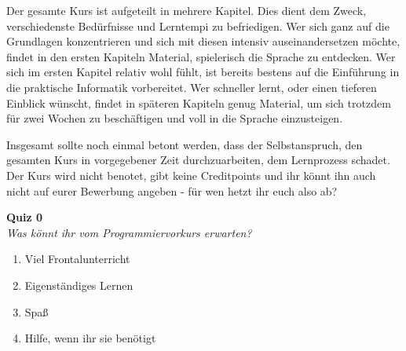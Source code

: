 \documentclass{vorkurs}
\begin{document}
Der gesamte Kurs ist aufgeteilt in mehrere Kapitel. Dies dient dem Zweck,
verschiedenste Bedürfnisse und Lerntempi zu befriedigen.  Wer sich ganz auf die
Grundlagen konzentrieren und sich mit diesen intensiv auseinandersetzen möchte,
findet in den ersten Kapiteln Material, spielerisch die Sprache zu entdecken.
Wer sich im ersten Kapitel relativ wohl fühlt, ist bereits bestens auf die
Einführung in die praktische Informatik vorbereitet.  Wer schneller lernt, oder
einen tieferen Einblick wünscht, findet in späteren Kapiteln genug Material, um
sich trotzdem für zwei Wochen zu beschäftigen und voll in die Sprache
einzusteigen.

Insgesamt sollte noch einmal betont werden, dass der Selbstanspruch, den
gesamten Kurs in vorgegebener Zeit durchzuarbeiten, dem Lernprozess schadet.
Der Kurs wird nicht benotet, gibt keine Creditpoints und ihr könnt ihn auch
nicht auf eurer Bewerbung angeben - für wen hetzt ihr euch also ab?

\textbf{Quiz 0}\\
\textit{Was könnt ihr vom Programmiervorkurs erwarten?}
\begin{enumerate}[label=\alph]
    \item Viel Frontalunterricht
    \item Eigenständiges Lernen
    \item Spaß
    \item Hilfe, wenn ihr sie benötigt
\end{enumerate}

\tableofcontents



\end{document}
